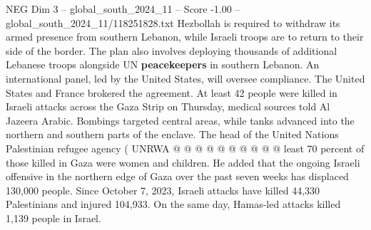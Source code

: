 \begin{textsample}{NEG Dim 3 – global\_south\_2024\_11 – Score -1.00 – global\_south\_2024\_11/118251828.txt}
Hezbollah is required to withdraw its armed presence from southern Lebanon, while Israeli troops are to return to their side of the border.
The plan also involves deploying thousands of additional Lebanese troops alongside UN \textbf{peacekeepers} in southern Lebanon.
An international panel, led by the United States, will oversee compliance.
The United States and France brokered the agreement.
At least 42 people were killed in Israeli attacks across the Gaza Strip on Thursday, medical sources told Al Jazeera Arabic.
Bombings targeted central areas, while tanks advanced into the northern and southern parts of the enclave.
The head of the United Nations Palestinian refugee agency ( UNRWA @ @ @ @ @ @ @ @ @ @ least 70 percent of those killed in Gaza were women and children.
He added that the ongoing Israeli offensive in the northern edge of Gaza over the past seven weeks has displaced 130,000 people.
Since October 7, 2023, Israeli attacks have killed 44,330 Palestinians and injured 104,933.
On the same day, Hamas-led attacks killed 1,139 people in Israel.

\end{textsample}
